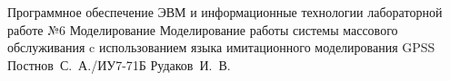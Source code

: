 \documentclass{bmstu}
\begin{document}
	
	{Программное обеспечение ЭВМ и информационные технологии}
	{лабораторной работе №6}
	{Моделирование}
	{Моделирование работы системы массового обслуживания c использованием языка имитационного моделирования GPSS}
	{}
	{Постнов~С.~А./ИУ7-71Б}
	{Рудаков~И.~В.}
	
	\maketableofcontents
	
	
	
	
	
\end{document}
